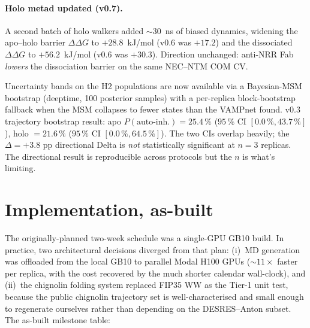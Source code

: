 \documentclass[11pt]{article}
\begin{document}
\begin{enumerate}[leftmargin=*,itemsep=2pt]
        \paragraph{Holo metad updated (v0.7).} A second batch of
        holo walkers added $\sim$30~ns of biased dynamics, widening
        the apo--holo barrier $\Delta\Delta G$ to
        $\mathbf{+28.8}$~kJ/mol (v0.6 was $+17.2$) and the
        dissociated $\Delta\Delta G$ to $\mathbf{+56.2}$~kJ/mol
        (v0.6 was $+30.3$). Direction unchanged: anti-NRR Fab
        \emph{lowers} the dissociation barrier on the same
        NEC--NTM COM CV.
\end{enumerate}

Uncertainty bands on the H2 populations are now available via a
Bayesian-MSM bootstrap (deeptime, 100 posterior samples) with a
per-replica block-bootstrap fallback when the MSM collapses to fewer
states than the VAMPnet found. v0.3 trajectory bootstrap result:
apo $P(\text{auto-inh.}) = 25.4\,\%$ ($95\,\%$ CI $[0.0\,\%, 43.7\,\%]$),
holo $= 21.6\,\%$ ($95\,\%$ CI $[0.0\,\%, 64.5\,\%]$). The two CIs
overlap heavily; the $\Delta = +3.8$ pp directional Delta is \emph{not}
statistically significant at $n = 3$ replicas. The directional
result is reproducible across protocols but the $n$ is what's
limiting.

\section{Implementation, as-built}
\label{sec:timeline}

The originally-planned two-week schedule was a single-GPU GB10 build.
In practice, two architectural decisions diverged from that plan:
(i)~MD generation was offloaded from the local GB10 to parallel
Modal H100 GPUs ($\sim\!11\times$ faster per replica, with the cost
recovered by the much shorter calendar wall-clock), and (ii)~the
chignolin folding system replaced FIP35 WW as the Tier-1 unit test,
because the public chignolin trajectory set is well-characterised and
small enough to regenerate ourselves rather than depending on the
DESRES--Anton subset. The as-built milestone table:
\end{document}
